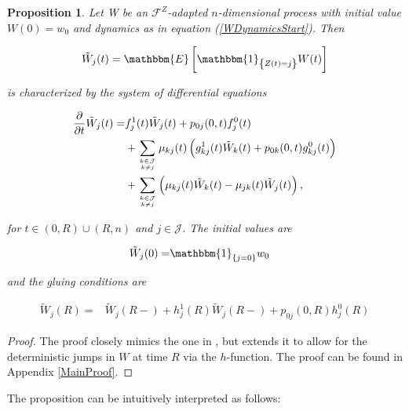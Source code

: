 \documentclass{article}
\newcommand{\1}[1]{\mathbbm{1}_{\left\lbrace #1 \right\rbrace}}
\newcommand{\expec}[1][def]{\mathbbm{E} \left[ #1 \right]}
\theoremstyle{break}
\newtheorem{proposition}[definition]{Proposition}%
\theoremstyle{remark}
\numberwithin{equation}{section}
\begin{document}
\begin{proposition} \label{MainResult}
	Let W be an $\mathcal{F}^{Z}$-adapted $n$-dimensional process with initial value $W(0)=w_0$ and dynamics as in equation (\ref{WDynamicsStart}). Then
	
	\begin{align*}
	\tilde{W}_j(t) = \expec[\1{Z(t)=j} W(t)]
	\end{align*}
	
	is characterized by the system of differential equations
	
	\begin{align} \label{MainEquation}
\begin{split}
		\frac{\partial}{\partial t} \tilde{W}_j(t) =& f_j^1(t) \tilde{W}_j(t) + p_{0j}(0,t) f_j^0(t) \\
	&+ \sum_{k \in \mathcal{J} \atop k \neq j} \mu_{kj}(t) \left( g_{kj}^1(t) \tilde{W}_k(t) + p_{0k}(0,t) g_{kj}^0(t) \right) \\
	&+ \sum_{k \in \mathcal{J} \atop k \neq j} \left( \mu_{kj}(t) \tilde{W}_k(t) - \mu_{jk}(t) \tilde{W}_j(t) \right),
\end{split}
	\end{align}

	
	for $t \in (0,R)\cup(R,n)$ and $j \in \mathcal{J}$. The initial values are
	
	\begin{align} \label{MainInit}
	\tilde{W}_j(0) =& \1{j=0} w_0
	\end{align}
	
	and the gluing conditions are
	
	\begin{align} \label{MainGlue}
	\tilde{W}_j(R) =& \tilde{W}_j(R-) + h_j^1(R) \tilde{W}_j(R-) + p_{0j}(0,R) h_j^0(R)
	\end{align}
	
\end{proposition}
\begin{proof}
	The proof closely mimics the one in \cite{Lollike}, but extends it to allow for the deterministic jumps in $W$ at time $R$ via the $h$-function. The proof can be found in Appendix \ref{MainProof}.
\end{proof}

The proposition can be intuitively interpreted as follows:
\end{document}
